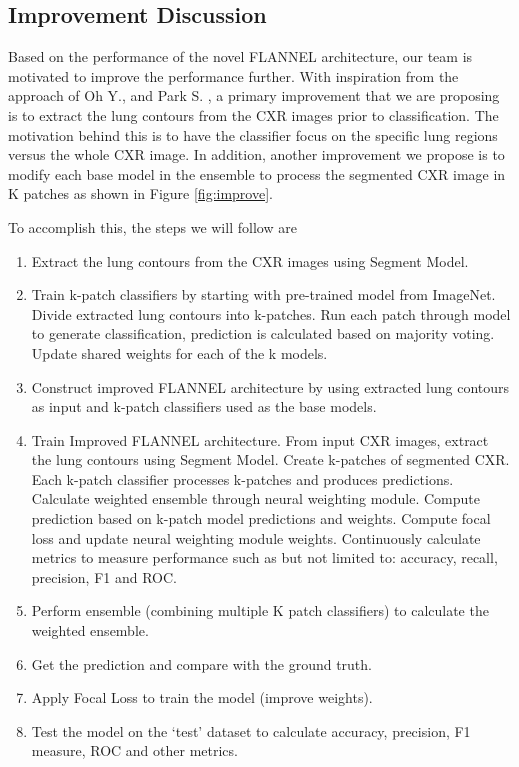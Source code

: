 \documentclass{sigkddExp}
\begin{document}
\subsection{Improvement Discussion}

Based on the performance of the novel FLANNEL architecture, our team is
motivated to improve the performance further. With inspiration from the approach
of Oh Y., and Park S. \cite{pmid32396075}, a primary improvement that we are
proposing is to extract the lung contours from the CXR images prior to
classification. The motivation behind this is to have the classifier focus on
the specific lung regions versus the whole CXR image. In addition, another
improvement we propose is to modify each base model in the ensemble to process
the segmented CXR image in K patches as shown in Figure \ref{fig:improve}.

To accomplish this, the steps we will follow are

\begin{enumerate}
    \item Extract the lung contours from the CXR images using Segment Model.
    \item Train k-patch classifiers by starting with pre-trained model from
          ImageNet. Divide extracted lung contours into k-patches. Run each patch
          through model to generate classification, prediction is calculated based on
          majority voting. Update shared weights for each of the k models.

    \item Construct improved FLANNEL architecture by using extracted lung
          contours as input and k-patch classifiers used as the base models.
    \item Train Improved FLANNEL architecture.
          From input CXR images, extract the lung contours using Segment Model.
          Create k-patches of segmented CXR.
          Each k-patch classifier processes k-patches and produces predictions.
          Calculate weighted ensemble through neural weighting module.
          Compute prediction based on k-patch model predictions and weights.
          Compute focal loss and update neural weighting module weights.
          Continuously calculate metrics to measure performance such as but
          not limited to: accuracy, recall, precision, F1 and ROC.
    \item Perform ensemble (combining multiple K patch classifiers) to calculate the weighted ensemble.
    \item Get the prediction and compare with the ground truth.
    \item Apply Focal Loss to train the model (improve weights).
    \item Test the model on the ‘test’ dataset to calculate accuracy, precision, F1 measure,
          ROC and other metrics.
\end{enumerate}
\end{document}
